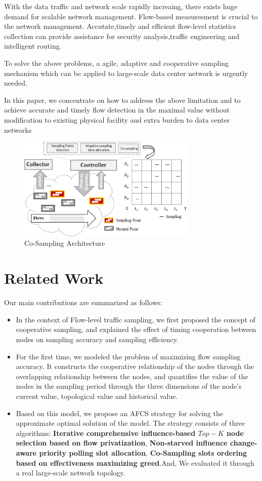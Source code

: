 \documentclass[conference]{IEEEtran}
\begin{document}
With the data traffic and network scale rapidly increaing, there exists huge demand for scalable network management. Flow-based measuresment is crucial to the network management. Accutate,timely and efficient flow-level statistics collection can provide assistance for security analysis,traffic engineering and intelligent routing. 

To solve the above problems, a agile, adaptive and cooperative sampling mechanism which can be applied to large-scale data center network is urgently needed. 

In this paper, we concentrate on how to address the above limitation and to achieve accurate and timely flow detection in the maximal value without modification to existing physical facility and extra burden to data center networks


\begin{figure}[!hhhhhhhhhht]
\centering
\includegraphics[width=8.5cm]{images/png_architecture.png}
\caption{Co-Sampling Architecture}
\label{Architecture}
\end{figure}

\section{Related Work}
Our main contributions are summarized as follows:
\begin{itemize}[leftmargin=*]
\setlength{\parindent}{0pt}

\item In the context of Flow-level traffic sampling, we first proposed the concept of cooperative sampling, and explained the effect of timing cooperation between nodes on sampling accuracy and sampling efficiency.
\item For the first time, we modeled the problem of maximizing flow sampling accuracy. It constructs the cooperative relationship of the nodes through the overlapping relationship between the nodes, and quantifies the value of the nodes in the sampling period through the three dimensions of the node's current value, topological value and historical value.
\item Based on this model, we propose an AFCS strategy for solving the approximate optimal solution of the model. The strategy consists of three algorithms: \textbf{Iterative comprehensive influence-based $Top-K$ node selection based on flow privatization}, \textbf{Non-starved influence change-aware priority polling slot allocation}, \textbf{Co-Sampling slots ordering based on effectiveness maximizing greed}.And, We evaluated it through a real large-scale network topology.
\end{itemize}
\end{document}
